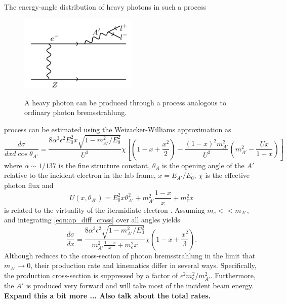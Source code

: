 The energy-angle distribution of heavy photons in such a process 
\begin{figure}[t]
    \centering
    \caption{A heavy photon can be produced through a process analogous to 
             ordinary photon bremsstrahlung.}
    \includegraphics[width=0.5\textwidth]{images/aprime_brem.png}
    \label{fig:ap_production}
\end{figure}  
process can be estimated using the Weizacker-Williams approximation as 
\begin{equation}
    \label{eqn:ap_diff_cross}
    \frac{d\sigma}{dx d\cos\theta_{A'}} =
    \frac{8 \alpha^{3} \epsilon^{2} E_{0}^2 x \sqrt{1-m_{A'}^{2}/E_{0}^{2}}}{U^{2}} \chi
    \left [ \left (1 - x + \frac{x^{2}}{2} \right ) 
    - \frac{(1-x)^{2} m_{A'}^{2}}{U^{2}}
    \left(m_{A'}^{2} - \frac{Ux}{1-x} \right) \right]
\end{equation}
where $\alpha \sim 1/137$ is the fine structure constant, $\theta_{A}$ is the
opening angle of the $A'$ relative to the incident electron in the lab frame, 
$x = E_{A'}/E_{0}$, $\chi$ is the effective photon flux and 
\begin{equation}
    U(x, \theta_{A'}) = E_{0}^{2}x\theta_{A'}^{2} 
    + m_{A'}^{2}\frac{1-x}{x} + m_{e}^2 x
\end{equation}
is related to the virtuality of the itermidiate electron \cite{PhysRevD.34.1326,
PhysRevD.80.075018}.  Assuming
$m_{e} << m_{A'}$, 
and integrating \ref{eqn:ap_diff_cross} over all angles yields
\begin{equation}
    \label{eqn:ap_diff_cross_i}
    \frac{d\sigma}{dx} = \frac{8\alpha^{3}\epsilon^{2} \sqrt{1-m_{A'}^{2}/E_{0}^{2}}}
    {m_{A'}^{2}\frac{1-x}{x} + m_{e}^{2}x}\chi
    \left( 1 - x + \frac{x^{2}}{3}\right).
\end{equation}
Although \cite{eqn:ap_diff_cross_i} reduces to the cross-section of photon 
bremsstrahlung in the limit that $m_{A'} \rightarrow 0$, their production rate
and kinematics differ in several ways. Specifically, the production 
cross-section is suppressed by a factor of $\epsilon^{2}m_{e}^{2}/m_{A'}^{2}$.
Furthermore, the $A'$ is produced very forward and will take most of the 
incident beam energy. \textbf{Expand this a bit more ... Also talk about the
total rates.}

